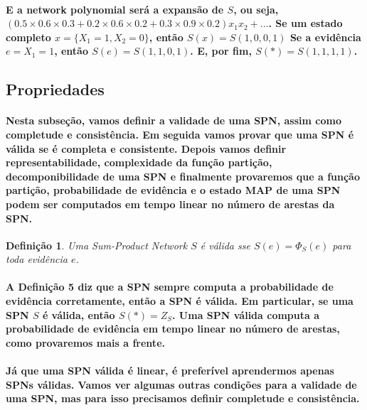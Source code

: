 \documentclass[a4paper,10pt]{article}
\theoremstyle{plain}
\newtheorem{spn-def}{Definição}
\begin{document}
\paragraph{
  E a network polynomial será a expansão de $S$, ou seja, $(0.5 \times 0.6 \times 0.3 + 0.2 \times
  0.6 \times 0.2 + 0.3 \times 0.9 \times 0.2)x_1x_2 + ...$. Se um estado completo $x = \{X_1 = 1,
  X_2 = 0\}$, então $S(x) = S(1, 0, 0, 1)$ Se a evidência $e={X_1=1}$, então $S(e)=S(1,1,0,1)$.
  E, por fim, $S(*) = S(1, 1, 1, 1)$.
}

\subsection{Propriedades}

\paragraph{
  Nesta subseção, vamos definir a validade de uma SPN, assim como completude e consistência. Em
  seguida vamos provar que uma SPN é válida se é completa e consistente. Depois vamos definir
  representabilidade, complexidade da função partição, decomponibilidade de uma SPN e finalmente
  provaremos que a função partição, probabilidade de evidência e o estado MAP\cite{report-1} de uma
  SPN podem ser computados em tempo linear no número de arestas da SPN.
}

\begin{spn-def} Uma Sum-Product Network $S$ é válida sse $S(e)=\Phi_S(e)$ para toda evidência $e$.
\end{spn-def}

\paragraph{
  A Definição 5 diz que a SPN sempre computa a probabilidade de evidência corretamente, então a SPN
  é válida. Em particular, se uma SPN $S$ é válida, então $S(*)=Z_S$. Uma SPN válida computa a
  probabilidade de evidência em tempo linear no número de arestas, como provaremos mais a frente.
}

\paragraph{
  Já que uma SPN válida é linear, é preferível aprendermos apenas SPNs válidas. Vamos ver algumas
  outras condições para a validade de uma SPN, mas para isso precisamos definir completude e
  consistência.
}
\end{document}
